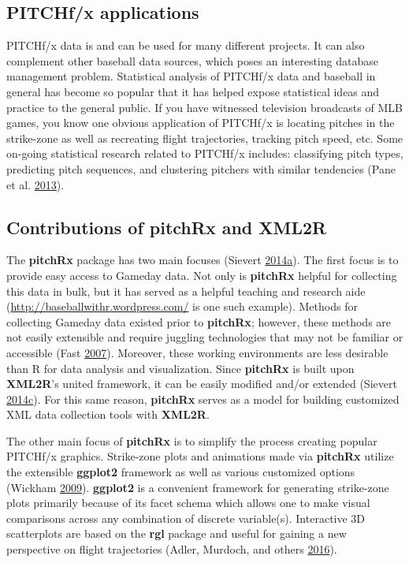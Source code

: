\documentclass[12pt,]{isuthesis}
\begin{document}
\subsection{PITCHf/x applications}\label{pitchfx-applications}

PITCHf/x data is and can be used for many different projects. It can
also complement other baseball data sources, which poses an interesting
database management problem. Statistical analysis of PITCHf/x data and
baseball in general has become so popular that it has helped expose
statistical ideas and practice to the general public. If you have
witnessed television broadcasts of MLB games, you know one obvious
application of PITCHf/x is locating pitches in the strike-zone as well
as recreating flight trajectories, tracking pitch speed, etc. Some
on-going statistical research related to PITCHf/x includes: classifying
pitch types, predicting pitch sequences, and clustering pitchers with
similar tendencies (Pane et al. \protect\hyperlink{ref-curve}{2013}).

\subsection[Contributions of pitchRx and XML2R]{Contributions of \textbf{pitchRx} and \textbf{XML2R}}

The \textbf{pitchRx} package has two main focuses (Sievert
\protect\hyperlink{ref-pitchRx}{2014}\protect\hyperlink{ref-pitchRx}{a}).
The first focus is to provide easy access to Gameday data. Not only is
\textbf{pitchRx} helpful for collecting this data in bulk, but it has
served as a helpful teaching and research aide
(\url{http://baseballwithr.wordpress.com/} is one such example). Methods
for collecting Gameday data existed prior to \textbf{pitchRx}; however,
these methods are not easily extensible and require juggling
technologies that may not be familiar or accessible (Fast
\protect\hyperlink{ref-database}{2007}). Moreover, these working
environments are less desirable than R for data analysis and
visualization. Since \textbf{pitchRx} is built upon \textbf{XML2R}'s
united framework, it can be easily modified and/or extended (Sievert
\protect\hyperlink{ref-XML2R}{2014}\protect\hyperlink{ref-XML2R}{c}).
For this same reason, \textbf{pitchRx} serves as a model for building
customized XML data collection tools with \textbf{XML2R}.

The other main focus of \textbf{pitchRx} is to simplify the process
creating popular PITCHf/x graphics. Strike-zone plots and animations
made via \textbf{pitchRx} utilize the extensible \textbf{ggplot2}
framework as well as various customized options (Wickham
\protect\hyperlink{ref-ggplot2}{2009}). \textbf{ggplot2} is a convenient
framework for generating strike-zone plots primarily because of its
facet schema which allows one to make visual comparisons across any
combination of discrete variable(s). Interactive 3D scatterplots are
based on the \textbf{rgl} package and useful for gaining a new
perspective on flight trajectories (Adler, Murdoch, and others
\protect\hyperlink{ref-rgl}{2016}).
\end{document}
